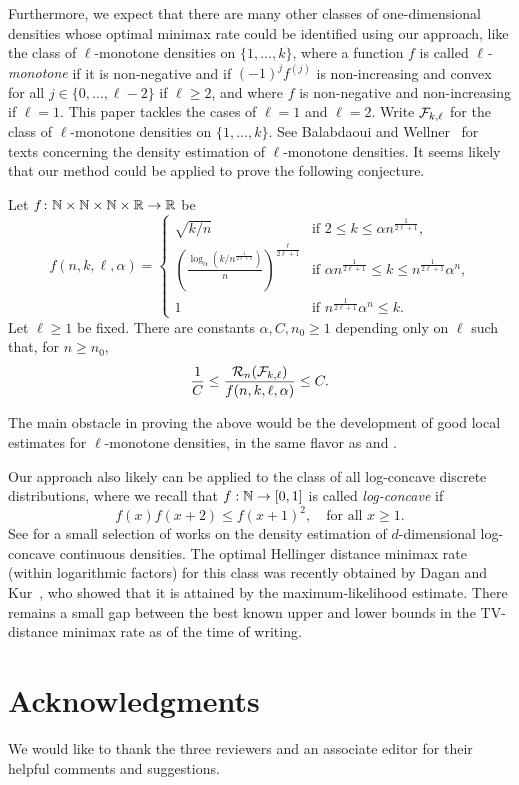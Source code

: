Furthermore, we expect that there are many other classes of
one-dimensional densities whose optimal minimax rate could be
identified using our approach, like the class of $\ell$-monotone
densities on $\{1, \dots, k\}$, where a function $f$ is called
\emph{$\ell$-monotone} if it is non-negative and if $(-1)^j f^{(j)}$
is non-increasing and convex for all $j \in \{0, \dots, \ell - 2\}$ if
$\ell \ge 2$, and where $f$ is non-negative and non-increasing if
$\ell = 1$. This paper tackles the cases of $\ell = 1$ and $\ell =
2$. Write $\mathcal{F}_{k, \ell}$ for the class of $\ell$-monotone densities
on $\{1, \dots, k\}$. See Balabdaoui and Wellner~\cite{k-monotone,
  k-monotone-2} for texts concerning the density estimation of
$\ell$-monotone densities. It seems likely that our method could be
applied to prove the following conjecture.
\begin{conj}
Let $f \colon \mathbb{N} \times \mathbb{N} \times \mathbb{N} \times \mathbb{R} \to \mathbb{R}$ be
\[
 f(n, k, \ell, \alpha) = \left\{
                         \begin{array}{ll}
                                \sqrt{k/n} & \mbox{if $2 \le k \le \alpha n^{\frac{1}{2\ell + 1}}$,} \\
                                {\left(\frac{\log_\alpha (k/n^{\frac{1}{2\ell + 1}})}{n}\right)}^{\frac{\ell}{2\ell + 1}} & \mbox{if $\alpha n^{\frac{1}{2\ell + 1}} \le k \le n^{\frac{1}{2\ell + 1}} \alpha^n$,} \\
                                1 & \mbox{if $n^{\frac{1}{2\ell + 1}} \alpha^n \le k.$}
                         \end{array}\right.
\]
Let $\ell \ge 1$ be fixed. There are constants $\alpha, C, n_0 \ge 1$
depending only on $\ell$ such that, for $n \ge n_0$,
\[
  \frac{1}{C} \le \frac{\mathcal{R}_n(\mathcal{F}_{k, \ell})}{f(n, k, \ell, \alpha)} \le C .
\]
\end{conj}
The main obstacle in proving the above would be the development of
good local estimates for $\ell$-monotone densities, in the same flavor
as  and .

Our approach also likely can be applied to the class of all
log-concave discrete distributions, where we recall that $f : \mathbb{N} \to
[0, 1]$ is called \emph{log-concave} if
\[
  f(x) f(x + 2) \le f(x + 1)^2 , \quad \text{for all } x \ge 1 .
\]
See \cite{kane-logconcave-up, samworth-lower, samworth-survey} for a
small selection of works on the density estimation of $d$-dimensional
log-concave continuous densities. The optimal Hellinger distance
minimax rate (within logarithmic factors) for this class was recently
obtained by Dagan and Kur~\cite{dagan}, who showed that it is attained
by the maximum-likelihood estimate. There remains a small gap between
the best known upper and lower bounds in the TV-distance minimax rate
as of the time of writing.

\section*{Acknowledgments}

We would like to thank the three reviewers and an associate editor for
their helpful comments and suggestions.
